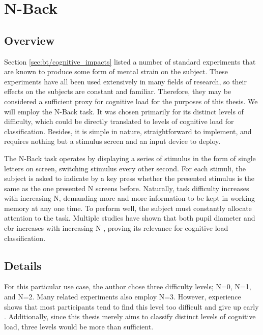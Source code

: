 \section{N-Back} \label{sec:impl/tasks}
\subsection{Overview}

Section \ref{sec:bt/cognitive_impacts} listed a number of standard experiments that are known to produce some form of mental strain on the subject. These experiments have all been used extensively in many fields of research, so their effects on the subjects are constant and familiar. Therefore, they may be considered a sufficient proxy for cognitive load for the purposes of this thesis. We will employ the N-Back task. It was chosen primarily for its distinct levels of difficulty, which could be directly translated to levels of cognitive load for classification. Besides, it is simple in nature, straightforward to implement, and requires nothing but a stimulus screen and an input device to deploy. 

The N-Back task operates by displaying a series of stimulus in the form of single letters on screen, switching stimulus every other second. For each stimuli, the subject is asked to indicate by a key press whether the presented stimulus is the same as the one presented N screens before. Naturally, task difficulty increases with increasing N, demanding more and more information to be kept in working memory at any one time. To perform well, the subject must constantly allocate attention to the task. Multiple studies have shown that both pupil diameter and \acrshort{ebr} increases with increasing N \cite{hopstaken2015, belayachi2015, brouwer2014, niezgoda2015}, proving its relevance for cognitive load classification. 

\subsection{Details}

For this particular use case, the author chose three difficulty levels; N=0, N=1, and N=2. Many related experiments also employ N=3. However, experience shows that most participants tend to find this level too difficult and give up early \cite{ayaz2007, izzetoglu2007}. Additionally, since this thesis merely aims to classify distinct levels of cognitive load, three levels would be more than sufficient.

